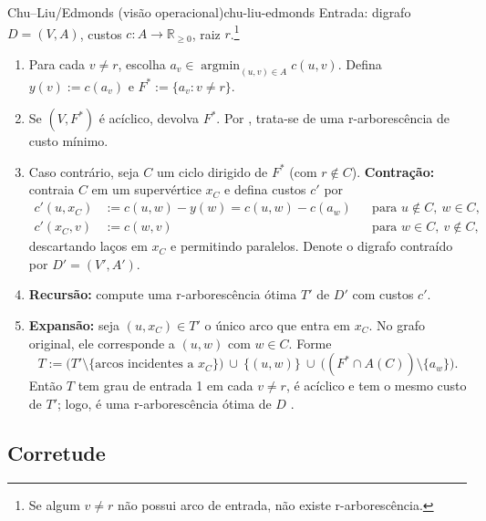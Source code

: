 \begin{algobox}{Chu–Liu/Edmonds (visão operacional)}{chu-liu-edmonds}
    Entrada: digrafo \(D=(V,A)\), custos \(c:A\to\mathbb{R}_{\ge 0}\), raiz \(r\).\footnote{Se algum \(v\neq r\) não possui arco de entrada, não existe r-arborescência.}
    \begin{enumerate}\setlength{\itemsep}{2pt}
        \item Para cada \(v\neq r\), escolha \(a_v\in\operatorname*{argmin}_{(u,v)\in A} c(u,v)\). Defina \(y(v):=c(a_v)\) e \(F^*:=\{a_v: v\neq r\}.\)
        \item Se \((V,F^*)\) é acíclico, devolva \(F^*\). Por \cite[Obs.~4.36]{kleinberg2006}, trata-se de uma r-arborescência de custo mínimo.
        \item Caso contrário, seja \(C\) um ciclo dirigido de \(F^*\) (com \(r\notin C\)). \textbf{Contração:} contraia \(C\) em um supervértice \(x_C\) e defina custos \(c'\) por
              \begin{align*}
                  c'(u,x_C) & := c(u,w) - y(w) = c(u,w) - c(a_w) &  & \text{para } u\notin C,\ w\in C, \\
                  c'(x_C,v) & := c(w,v)                          &  & \text{para } w\in C,\ v\notin C,
              \end{align*}
              descartando laços em \(x_C\) e permitindo paralelos. Denote o digrafo contraído por \(D'=(V',A')\).
        \item \textbf{Recursão:} compute uma r-arborescência ótima \(T'\) de \(D'\) com custos \(c'\).
        \item \textbf{Expansão:} seja \((u,x_C)\in T'\) o único arco que entra em \(x_C\). No grafo original, ele corresponde a \((u,w)\) com \(w\in C\). Forme
              \[
                  T := \bigl(T'\setminus\{\text{arcos incidentes a } x_C\}\bigr)\ \cup\ \{(u,w)\}\ \cup\ \bigl((F^*\cap A(C))\setminus\{a_w\}\bigr).
              \]
              Então \(T\) tem grau de entrada 1 em cada \(v\neq r\), é acíclico e tem o mesmo custo de \(T'\); logo, é uma r-arborescência ótima de \(D\) \cite[Sec.~4.9]{kleinberg2006,schrijver2003comb}.
    \end{enumerate}
\end{algobox}

\subsection{Corretude}

